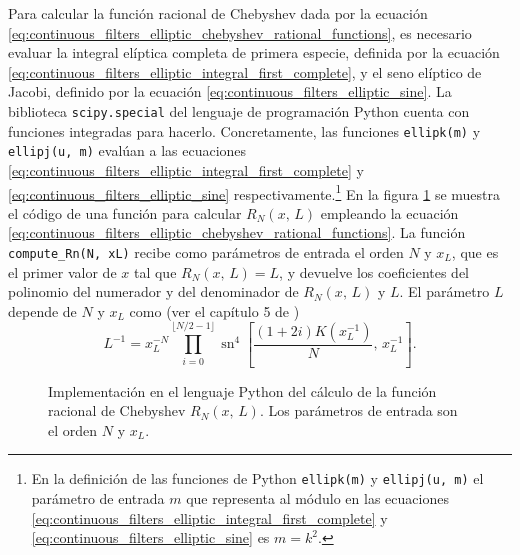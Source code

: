 \documentclass[a4paper]{report}
\begin{document}
Para calcular la función racional de Chebyshev dada por la ecuación \ref{eq:continuous_filters_elliptic_chebyshev_rational_functions}, es necesario evaluar la integral elíptica completa de primera especie, definida por la ecuación \ref{eq:continuous_filters_elliptic_integral_first_complete}, y el seno elíptico de Jacobi, definido por la ecuación \ref{eq:continuous_filters_elliptic_sine}. La biblioteca \texttt{scipy.special} del lenguaje de programación Python cuenta con funciones integradas para hacerlo. Concretamente, las funciones \texttt{ellipk(m)} y \texttt{ellipj(u, m)} evalúan a las ecuaciones \ref{eq:continuous_filters_elliptic_integral_first_complete} y \ref{eq:continuous_filters_elliptic_sine} respectivamente.\footnote{En la definición de las funciones de Python \texttt{ellipk(m)} y \texttt{ellipj(u, m)} el parámetro de entrada \(m\) que representa al módulo en las ecuaciones \ref{eq:continuous_filters_elliptic_integral_first_complete} y \ref{eq:continuous_filters_elliptic_sine} es \(m=k^2\).} En la figura \ref{fig:continuous_filters_elliptic_compute_Rn} se muestra el código de una función para calcular \(R_N(x,\,L)\) empleando la ecuación \ref{eq:continuous_filters_elliptic_chebyshev_rational_functions}. La función \texttt{compute\_Rn(N, xL)} recibe como parámetros de entrada el orden \(N\) y \(x_L\), que es el primer valor de \(x\) tal que \(R_N(x,\,L)=L\), y devuelve los coeficientes del polinomio del numerador y del denominador de \(R_N(x,\,L)\) y \(L\). El parámetro \(L\) depende de \(N\) y \(x_L\) como (ver el capítulo 5 de \cite{daniels1974approximation})
\[
 L^{-1}=x_L^{-N}\prod_{i=0}^{\lfloor N/2-1\rfloor}\operatorname{sn}^4\left[\frac{(1+2i)K(x_L^{-1})}{N},\,x_L^{-1}\right].
\]
\begin{figure}
\begin{center}

\caption{\label{fig:continuous_filters_elliptic_compute_Rn} Implementación en el lenguaje Python del cálculo de la función racional de Chebyshev \(R_N(x,\,L)\). Los parámetros de entrada son el orden \(N\) y \(x_L\).}
\end{center}
\end{figure}
\end{document}
